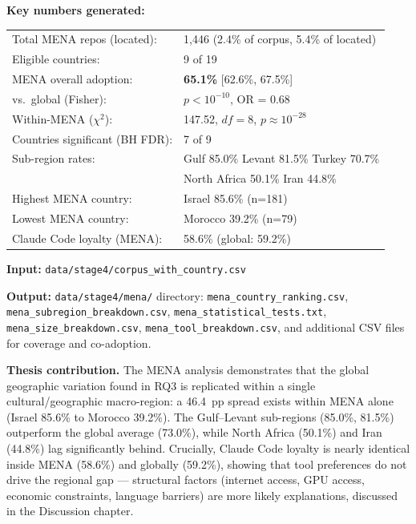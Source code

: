 \documentclass[11pt,a4paper]{article}
\begin{document}
\begin{numbersbox}
\textbf{Key numbers generated:}\\[2pt]
\begin{tabular}{@{}ll@{}}
Total MENA repos (located):      & 1,446 (2.4\% of corpus, 5.4\% of located) \\
Eligible countries:              & 9 of 19 \\
MENA overall adoption:           & \textbf{65.1\%} [62.6\%, 67.5\%] \\
vs.\ global (Fisher):            & $p < 10^{-10}$, OR = 0.68 \\
Within-MENA ($\chi^2$):          & 147.52, $df=8$, $p \approx 10^{-28}$ \\
Countries significant (BH FDR):  & 7 of 9 \\[4pt]
Sub-region rates:                & Gulf 85.0\% \quad Levant 81.5\% \quad Turkey 70.7\% \\
                                 & North Africa 50.1\% \quad Iran 44.8\% \\[4pt]
Highest MENA country:            & Israel 85.6\% (n=181) \\
Lowest MENA country:             & Morocco 39.2\% (n=79) \\
Claude Code loyalty (MENA):      & 58.6\% (global: 59.2\%) \\
\end{tabular}
\end{numbersbox}

\textbf{Input:} \texttt{data/stage4/corpus\_with\_country.csv}

\textbf{Output:} \texttt{data/stage4/mena/} directory: \texttt{mena\_country\_ranking.csv},
\texttt{mena\_subregion\_breakdown.csv}, \texttt{mena\_statistical\_tests.txt},
\texttt{mena\_size\_breakdown.csv}, \texttt{mena\_tool\_breakdown.csv},
and additional CSV files for coverage and co-adoption.

\begin{outputbox}
\textbf{Thesis contribution.}
The MENA analysis demonstrates that the global geographic variation found in
RQ3 is replicated within a single cultural/geographic macro-region: a 46.4~pp
spread exists within MENA alone (Israel 85.6\% to Morocco 39.2\%).
The Gulf--Levant sub-regions (85.0\%, 81.5\%) outperform the global average
(73.0\%), while North Africa (50.1\%) and Iran (44.8\%) lag significantly
behind. Crucially, Claude Code loyalty is nearly identical inside MENA
(58.6\%) and globally (59.2\%), showing that tool preferences do not drive
the regional gap --- structural factors (internet access, GPU access,
economic constraints, language barriers) are more likely explanations,
discussed in the Discussion chapter.
\end{outputbox}
\end{document}
